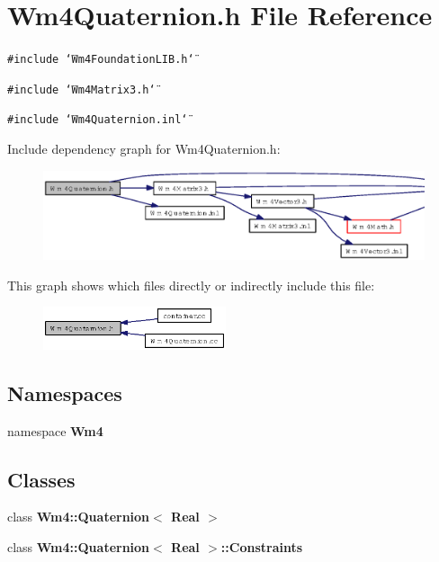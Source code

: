 \section{Wm4Quaternion.h File Reference}
\label{Wm4Quaternion_8h}
{\tt \#include \char`\"{}Wm4Foundation\-LIB.h\char`\"{}}\par
{\tt \#include \char`\"{}Wm4Matrix3.h\char`\"{}}\par
{\tt \#include \char`\"{}Wm4Quaternion.inl\char`\"{}}\par


Include dependency graph for Wm4Quaternion.h:\begin{figure}[H]
\begin{center}
\leavevmode
\includegraphics[width=368pt]{Wm4Quaternion_8h__incl}
\end{center}
\end{figure}


This graph shows which files directly or indirectly include this file:\begin{figure}[H]
\begin{center}
\leavevmode
\includegraphics[width=152pt]{Wm4Quaternion_8h__dep__incl}
\end{center}
\end{figure}
\subsection*{Namespaces}
\begin{CompactItemize}
\item 
namespace {\bf Wm4}
\end{CompactItemize}
\subsection*{Classes}
\begin{CompactItemize}
\item 
class {\bf Wm4::Quaternion$<$ Real $>$}
\item 
class {\bf Wm4::Quaternion$<$ Real $>$::Constraints}
\end{CompactItemize}
